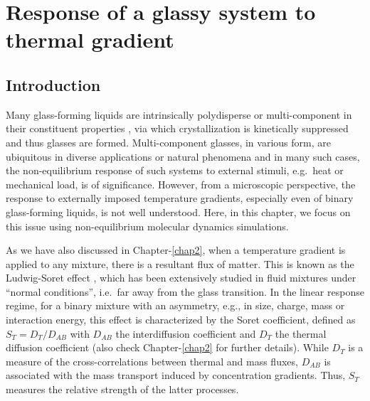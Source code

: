 \pagestyle{fancy}
\fancyhf{}
\renewcommand{\headrulewidth}{0pt}
\fancyfoot[C]{\leftmark}
\fancyhead[R]{\thepage}
\doublespacing
\chapter{Response of a glassy system to thermal gradient}\label{chap3}

\noindent{}

\section{Introduction} 

Many glass-forming liquids are intrinsically polydisperse or multi-component in their constituent properties \cite{glassbook}, via which crystallization is kinetically suppressed and thus glasses are formed.  Multi-component glasses, in various form, are ubiquitous in diverse applications or natural phenomena and in many such cases, the non-equilibrium response of such systems to external stimuli, e.g.~heat or mechanical load, is of significance. However, from a microscopic perspective, the response to externally imposed temperature gradients, especially even of binary glass-forming liquids, is not well understood. Here, in this chapter, we focus on this issue using non-equilibrium molecular dynamics simulations.

As we have also discussed in Chapter-\ref{chap2}, when a temperature gradient is applied to any mixture, there is a resultant flux of matter. This is known as the Ludwig-Soret effect \cite{ludwig,soret,degroot}, which has been extensively studied \cite{ikeshoji1994, reith, artola07, platten2006, bresme2014, koehler2016, ciccotti2017} in fluid mixtures under ``normal conditions'', i.e.~far away from the glass transition.  In the linear response regime, for a binary mixture with an asymmetry, e.g., in size, charge, mass or interaction energy, this effect is characterized by the Soret coefficient, defined as $S_T=D_T/D_{AB}$ with $D_{AB}$ the interdiffusion coefficient and $D_T$ the thermal diffusion coefficient (also check Chapter-\ref{chap2} for further details). While $D_T$ is a measure of the cross-correlations between thermal and mass fluxes, $D_{AB}$ is associated with the mass transport induced by concentration gradients. Thus, $S_T$ measures the relative strength of the latter processes.

